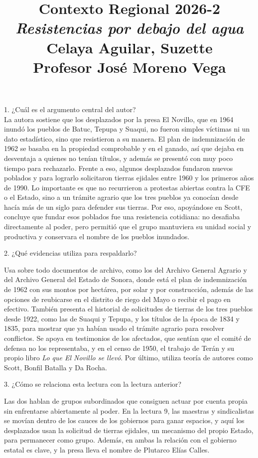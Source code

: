 \documentclass[a4paper, 11pt]{article}
\title
{
    \textbf{Contexto Regional 2026-2} \\[0.3cm]
    {\large \textit{Resistencias por debajo del agua}} \\[0.2cm]
    {\normalsize Celaya Aguilar, Suzette} \\[0.3cm]
    {\normalsize Profesor José Moreno Vega}
}
\date{}
\begin{document}
\begin{otherlanguage}{spanish}
\maketitle
\end{otherlanguage}
\thispagestyle{fancy}
\vspace{-0.5cm}


{\Large 1. ¿Cuál es el argumento central del autor?} \\
{\color{azul}
    La autora sostiene que los desplazados por la presa El Novillo, que en 1964 inundó los pueblos de Batuc, Tepupa y Suaqui, no fueron simples víctimas ni un dato estadístico, sino que resistieron a su manera. El plan de indemnización de 1962 se basaba en la propiedad comprobable y en el ganado, así que dejaba en desventaja a quienes no tenían títulos, y además se presentó con muy poco tiempo para rechazarlo. Frente a eso, algunos desplazados fundaron nuevos poblados y para lograrlo solicitaron tierras ejidales entre 1960 y los primeros años de 1990. Lo importante es que no recurrieron a protestas abiertas contra la CFE o el Estado, sino a un trámite agrario que los tres pueblos ya conocían desde hacía más de un siglo para defender sus tierras. Por eso, apoyándose en Scott, concluye que fundar esos poblados fue una resistencia cotidiana: no desafiaba directamente al poder, pero permitió que el grupo mantuviera su unidad social y productiva y conservara el nombre de los pueblos inundados.
}
\vspace{1cm}

{\Large 2. ¿Qué evidencias utiliza para respaldarlo?} \par
{\color{azul}
Usa sobre todo documentos de archivo, como los del Archivo General Agrario y del Archivo General del Estado de Sonora, donde está el plan de indemnización de 1962 con sus montos por hectárea, por solar y por construcción, además de las opciones de reubicarse en el distrito de riego del Mayo o recibir el pago en efectivo. También presenta el historial de solicitudes de tierras de los tres pueblos desde 1922, como las de Suaqui y Tepupa, y los títulos de la época de 1834 y 1835, para mostrar que ya habían usado el trámite agrario para resolver conflictos. Se apoya en testimonios de los afectados, que sentían que el comité de defensa no los representaba, y en el censo de 1950, el trabajo de Terán y su propio libro \textit{Lo que El Novillo se llevó}. Por último, utiliza teoría de autores como Scott, Bonfil Batalla y Da Rocha.
}
\vspace{1cm}

{\Large 3. ¿Cómo se relaciona esta lectura con la lectura anterior?} \par
{\color{azul}
Las dos hablan de grupos subordinados que consiguen actuar por cuenta propia sin enfrentarse abiertamente al poder. En la lectura 9, las maestras y sindicalistas se movían dentro de los cauces de los gobiernos para ganar espacios, y aquí los desplazados usan la solicitud de tierras ejidales, un mecanismo del propio Estado, para permanecer como grupo. Además, en ambas la relación con el gobierno estatal es clave, y la presa lleva el nombre de Plutarco Elías Calles.
}
\end{document}
